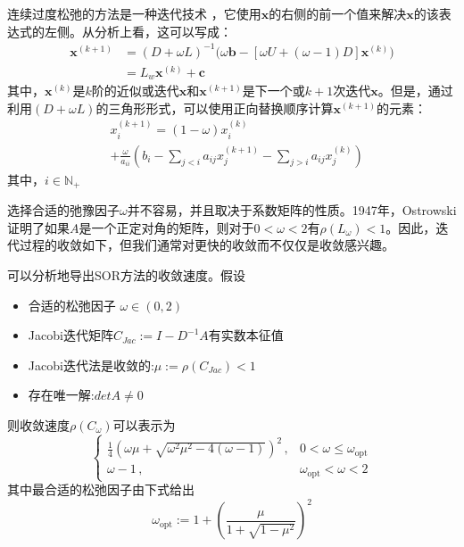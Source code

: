 \documentclass[twoside,twocolumn]{article}
\begin{document}
\begin{CJK*}{UTF8}{gkai}
	连续过度松弛的方法是一种迭代技术 ，它使用$\mathbf{x}$的右侧的前一个值来解决$\mathbf{x}$的该表达式的左侧。从分析上看，这可以写成：
	\begin{equation*}
	\begin{aligned}
		\mathbf {x} ^{(k+1)}&=(D+\omega L)^{-1}{\big (}\omega \mathbf {b} -[\omega U+(\omega -1)D]\mathbf {x} ^{(k)}{\big )}\\
		&=L_{w}\mathbf {x} ^{(k)}+\mathbf {c}
	\end{aligned}
	\end{equation*}
	其中，$\mathbf{x}^{(k)}$是$k$阶的近似或迭代$\mathbf{x}$和$\mathbf{x}^{(k+1)}$是下一个或$k+1$次迭代$\mathbf{x}$。但是，通过利用$(D+\omega L)$的三角形形式，可以使用正向替换顺序计算$\mathbf{x}^{(k+1)}$的元素：
	\begin{equation*}
	\begin{aligned}
	&x_{i}^{(k+1)}=(1-\omega )x_{i}^{(k)}\\&+{\frac {\omega }{a_{ii}}}\left(b_{i}-\sum _{j<i}a_{ij}x_{j}^{(k+1)}-\sum _{j>i}a_{ij}x_{j}^{(k)}\right)
	\end{aligned}
	\end{equation*}
	其中，$i\in \mathbb{N}_{+}$
	
	选择合适的弛豫因子$\omega$并不容易，并且取决于系数矩阵的性质。1947年，Ostrowski证明了如果$A$是一个正定对角的矩阵，则对于$0<\omega<2$有$\rho(L_{\omega})<1$。因此，迭代过程的收敛如下，但我们通常对更快的收敛而不仅仅是收敛感兴趣。
	
	可以分析地导出SOR方法的收敛速度。假设
	\begin{itemize}
		\item 合适的松弛因子 $\omega\in (0,2)$
		\item Jacobi迭代矩阵$C_{Jac}:=I-D^{-1}A$有实数本征值
		\item Jacobi迭代法是收敛的:$\mu:=\rho(C_{Jac})<1$
		\item 存在唯一解:$det A\neq 0$
	\end{itemize}
	则收敛速度$\rho (C_{\omega })$可以表示为
	\begin{equation*}
	{\begin{cases}{\frac {1}{4}}\left(\omega \mu +{\sqrt {\omega ^{2}\mu ^{2}-4(\omega -1)}}\right)^{2}\,,&0<\omega \leq \omega _{\text{opt}}\\\omega -1\,,&\omega _{\text{opt}}<\omega <2\end{cases}}
	\end{equation*}
	其中最合适的松弛因子由下式给出
	\begin{equation*}
	\omega _{\text{opt}}:=1+\left({\frac {\mu }{1+{\sqrt {1-\mu ^{2}}}}}\right)^{2}
	\end{equation*}

\end{CJK*}
\end{document}
